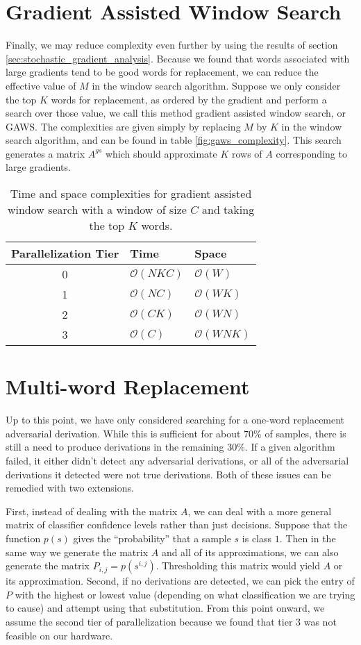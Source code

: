 \section{Gradient Assisted Window Search}
Finally, we may reduce complexity even further by using the results of section \ref{sec:stochastic_gradient_analysis}.  Because we found that words associated with large gradients tend to be good words for replacement, we can reduce the effective value of $M$ in the window search algorithm.  Suppose we only consider the top $K$ words for replacement, as ordered by the gradient and perform a search over those value, we call this method gradient assisted window search, or GAWS.  The complexities are given simply by replacing $M$ by $K$ in the window search algorithm, and can be found in table \ref{fig:gaws_complexity}.  This search generates a matrix $A^{gs}$ which should approximate $K$ rows of $A$ corresponding to large gradients.
\begin{table}
\centering
\begin{tabular}{ |c|l|l| } 
 \hline
 Parallelization Tier & Time & Space \\ \hline
 0&$\mathcal{O}(NKC)$ & $\mathcal{O}(W)$ \\
 1&$\mathcal{O}(NC)$ & $\mathcal{O}(WK)$ \\
 2&$\mathcal{O}(CK)$ & $\mathcal{O}(WN)$ \\
 3&$\mathcal{O}(C)$ & $\mathcal{O}(WNK)$ \\ \hline
\end{tabular}
\caption{Time and space complexities for gradient assisted window search with a window of size $C$ and taking the top $K$ words.}
\label{tab:gaws_complexity}
\end{table}
\section{Multi-word Replacement}
Up to this point, we have only considered searching for a one-word replacement adversarial derivation.  While this is sufficient for about $70\%$ of samples, there is still a need to produce derivations in the remaining $30\%$.  If a given algorithm failed, it either didn't detect any adversarial derivations, or all of the adversarial derivations it detected were not true derivations.  Both of these issues can be remedied with two extensions.  

First, instead of dealing with the matrix $A$, we can deal with a more general matrix of classifier confidence levels rather than just decisions.  Suppose that the function $p(s)$ gives the ``probability'' that a sample $s$ is class $1$.  Then in the same way we generate the matrix $A$ and all of its approximations, we can also generate the matrix $P_{i,j} = p(s^{i,j})$.  Thresholding this matrix would yield $A$ or its approximation.  Second, if no derivations are detected, we can pick the entry of $P$ with the highest or lowest value (depending on what classification we are trying to cause) and attempt using that substitution.  From this point onward, we assume the second tier of parallelization because we found that tier 3 was not feasible on our hardware.

